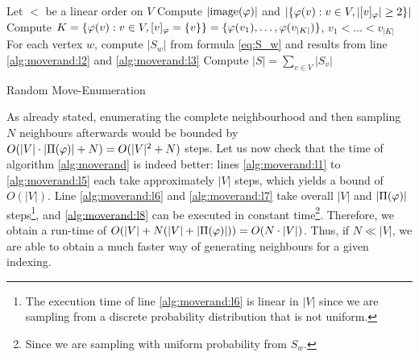 \begin{algorithm}[H]
    \SetAlgoLined
    \DontPrintSemicolon
    Let $<$ be a linear order on $V$ \label{alg:moverand:l1} \;
    Compute $|\mathrm{image}(\varphi)|$ and $|\{ \varphi(v) : v\in V, |[v]_\varphi| \geq 2 \}|$ \label{alg:moverand:l2} \;
    Compute $K = \{ \varphi(v) : v \in V, [v]_\varphi = \{v\}\} = \{ \varphi(v_1),\dots,\varphi(v_{|K|}) \}$, $v_1 < \dots < v_{|K|} $ \label{alg:moverand:l3} \;
    For each vertex $w$, compute $|S_w|$ from formula \eqref{eq:S_w} and results from line \ref{alg:moverand:l2} and \ref{alg:moverand:l3} \label{alg:moverand:l4} \;
    Compute $|S| = \sum_{v \in V} |S_v|$ \label{alg:moverand:l5} \;
    \caption{Random Move-Enumeration} \label{alg:moverand}
\end{algorithm}

As already stated, enumerating the complete neighbourhood and then sampling $N$ neighbours afterwards would be bounded by $O(|V|\cdot|\Pi(\varphi)|+ N) = O(|V|^2+N)$ steps. Let us now check that the time of algorithm \ref{alg:moverand} is indeed better: lines \ref{alg:moverand:l1} to \ref{alg:moverand:l5} each take approximately $|V|$ steps, which yields a bound of $O(|V|)$. Line \ref{alg:moverand:l6} and \ref{alg:moverand:l7} take overall $|V|$ and $|\Pi(\varphi)|$ steps\footnote{The execution time of line \ref{alg:moverand:l6} is linear in $|V|$ since we are sampling from a discrete probability distribution that is not uniform.}, and \ref{alg:moverand:l8} can be executed in constant time\footnote{Since we are sampling with uniform probability from $S_w$.}. Therefore, we obtain a run-time of $O(|V| + N(|V| + |\Pi(\varphi)|)) = O(N\cdot |V|)$. Thus, if $N \ll |V|$, we are able to obtain a much faster way of generating neighbours for a given indexing.
